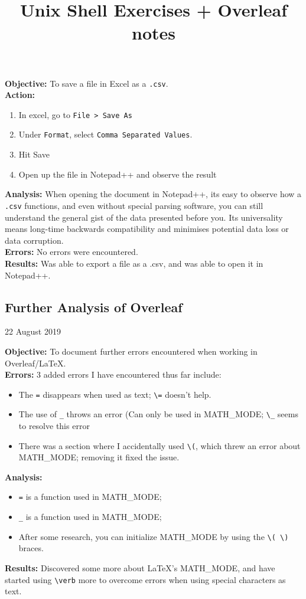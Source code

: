 \documentclass{article}
\begin{document}
\textbf{Objective:} To save a file in Excel as a \verb|.csv|.\\
\textbf{Action:}
\begin{enumerate}
    \item In excel, go to \verb|File > Save As|
    \item Under \verb|Format|, select \verb|Comma Separated Values|.
    \item Hit Save
    \item Open up the file in Notepad++ and observe the result
\end{enumerate}
\textbf{Analysis:} When opening the document in Notepad++, its easy to observe how a \verb|.csv| functions, and even without special parsing software, you can still understand the general gist of the data presented before you. Its universality means long-time backwards compatibility and minimises potential data loss or data corruption.\\
\textbf{Errors:} No errors were encountered.\\
\textbf{Results:} Was able to export a file as a .csv, and was able to open it in Notepad++.
\newpage
\begin{center}
\section{Further Analysis of Overleaf}
22 August 2019
\end{center}
\textbf{Objective:} To document further errors encountered when working in Overleaf/LaTeX. \\
\textbf{Errors:} 3 added errors I have encountered thus far include:
\begin{itemize}
    \item The \verb|=| disappears when used as text; \verb|\=| doesn't help.
    \item The use of \verb|_| throws an error (Can only be used in MATH\_MODE; \verb|\_| seems to resolve this error
    \item There was a section where I accidentally used \verb|\(|, which threw an error about MATH\_MODE; removing it fixed the issue.
\end{itemize}
\textbf{Analysis:}
\begin{itemize}
    \item \verb|=| is a function used in MATH\_MODE;
    \item \verb|_| is a function used in MATH\_MODE;
    \item After some research, you can initialize MATH\_MODE by using the \verb|\( \)| braces.
\end{itemize}
\textbf{Results:} Discovered some more about LaTeX's MATH\_MODE, and have \\started using \verb|\verb| more to overcome errors when using special characters as text.
\newpage
\title{Unix Shell Exercises + Overleaf notes}
\maketitle
\newpage
\end{document}
